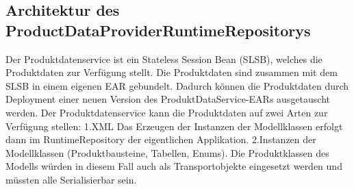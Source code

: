 \documentclass[headsepline=true, footsepline=true]{scrartcl}
\begin{document}
\subsection{Architektur des ProductDataProviderRuntimeRepositorys}



Der Produktdatenservice ist ein Stateless
Session Bean (SLSB), welches die Produktdaten zur Verfügung stellt. Die
Produktdaten sind zusammen mit dem SLSB in einem eigenen EAR gebundelt. Dadurch
können die Produktdaten durch Deployment einer neuen Version des
ProduktDataService-EARs ausgetauscht werden. Der Produktdatenservice kann die
Produktdaten auf zwei Arten zur Verfügung stellen: 1.XML Das Erzeugen der
Instanzen der Modellklassen erfolgt dann im RuntimeRepository der eigentlichen
Applikation. 2.Instanzen der Modellklassen (Produktbausteine, Tabellen, Enums).
Die Produktklassen des Modells würden in diesem Fall auch als Transportobjekte
eingesetzt werden und müssten alle Serialisierbar sein.
\end{document}
